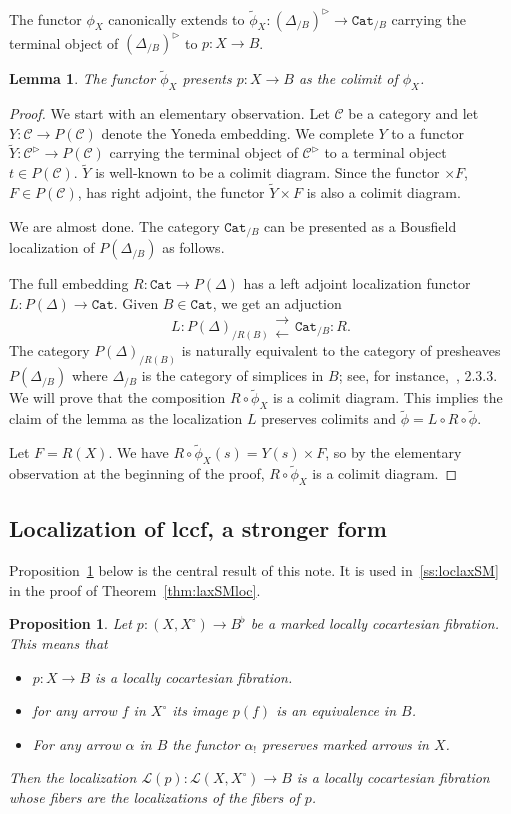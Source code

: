 \documentclass[12pt]{amsart}%
\newtheorem{lem}[subsubsection]{Lemma}
\newtheorem{prp}[subsubsection]{Proposition}
\newcommand{\Cat}{\mathtt{Cat}}
\newcommand{\rlarrows}{\substack{\longrightarrow\\ \longleftarrow}}
\newcommand{\cC}{\mathcal{C}}
\newcommand{\cL}{\mathcal{L}}
\begin{document}
The functor $\phi_X$ canonically extends to 
$\tilde\phi_X:(\Delta_{/B})^\triangleright\to\Cat_{/B}$ carrying the terminal object of $(\Delta_{/B})^\triangleright$ to $p:X\to B$.

\begin{lem}
\label{lem:colim}
The functor $\tilde\phi_X$ presents $p:X\to B$ as the
colimit of $\phi_X$.
\end{lem}
\begin{proof} We start with an elementary observation. Let $\cC$ be a category and let $Y:\cC\to P(\cC)$ denote the Yoneda embedding. We complete $Y$ to a functor $\tilde Y:\cC^\triangleright\to P(\cC)$ carrying the terminal object
of $\cC^\triangleright$ to a terminal object $t\in P(\cC)$.
$\tilde Y$ is well-known to be a colimit diagram. Since
the functor $\times F$, $F\in P(\cC)$, has right adjoint, 
the functor $\tilde Y\times F$ is also a colimit diagram.

We are almost done. The category $\Cat_{/B}$ can be presented 
as a Bousfield localization of $P(\Delta_{/B})$ as follows.

The full embedding
$R:\Cat\to P(\Delta)$ has a left adjoint localization functor $L:P(\Delta)\to\Cat$.
Given $B\in\Cat$, we get an adjuction
$$
L:P(\Delta)_{/R(B)}\rlarrows \Cat_{/B}:R.
$$
 The category $P(\Delta)_{/R(B)}$  is naturally equivalent to the category of presheaves $P(\Delta_{/B})$ where 
 $\Delta_{/B}$ is the category of simplices in $B$; see, for instance,~\cite{HM}, 2.3.3. We will prove that the composition $R\circ\tilde\phi_X$ is a colimit 
diagram. This implies the claim of the lemma as the localization $L$ preserves colimits and
$\tilde\phi=L\circ R\circ\tilde\phi$.

Let $F=R(X)$. We have $R\circ\tilde\phi_X(s)=Y(s)\times F$,
so by the elementary observation at the beginning of the proof, $R\circ\tilde\phi_X$ is a colimit diagram.

\end{proof}

 
\subsection{Localization of lccf, a stronger form}

Proposition~\ref{prp:loc} below is the central result of this note.
It is used in~\ref{ss:loclaxSM} in the proof of
Theorem~\ref{thm:laxSMloc}.

\begin{prp}
\label{prp:loc}
Let $p:(X,X^\circ)\to B^\flat$ be a marked locally cocartesian fibration. This means that
\begin{itemize}
\item[1.] $p:X\to B$ is a locally cocartesian fibration.
\item[2.] for any arrow $f$ in $X^\circ$ its image  $p(f)$ is an equivalence in $B$.
\item[3.] For any arrow $\alpha$ in $B$ the functor $\alpha_!$ preserves
marked arrows in $X$.
\end{itemize}
Then the localization $\cL(p):\cL(X,X^\circ)\to B$ is a locally cocartesian fibration whose fibers are the localizations of the fibers of $p$.
\end{prp}
\end{document}
